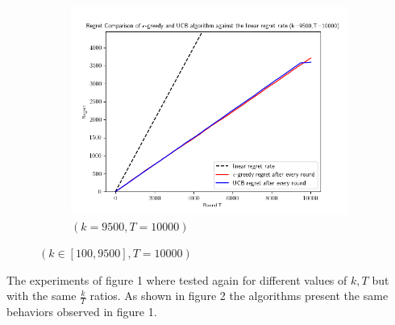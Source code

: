 \documentclass[12pt]{article}
\begin{document}
\begin{enumerate}
\begin{figure}[h!]
\begin{subfigure}[b]{0.3\textwidth}
					\includegraphics[width=\textwidth]{fig10.png}
					\caption{$(k=9500, T=10000)$}
				\end{subfigure}
				\caption{$(k\in[100,9500], T=10000)$}			
			\end{figure}
		
			The experiments of figure 1 where tested again for different values of $k,T$ but with the same $\frac{k}{T}$ ratios. As shown in figure 2 the algorithms present the same behaviors observed in figure 1.
		\end{enumerate}
	
\end{document}
